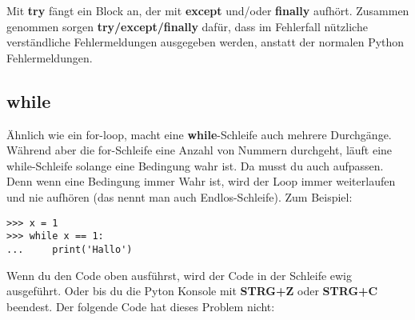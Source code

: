 Mit \textbf{try} fängt ein Block an, der mit \textbf{except} und/oder \textbf{finally} aufhört. Zusammen genommen sorgen \textbf{try/except/finally} dafür, dass im Fehlerfall nützliche verständliche Fehlermeldungen ausgegeben werden, anstatt der normalen Python Fehlermeldungen.

\subsection*{while}

Ähnlich wie ein for-loop, macht eine \textbf{while}-Schleife auch mehrere Durchgänge. Während aber die for-Schleife eine Anzahl von Nummern durchgeht, läuft eine while-Schleife solange eine Bedingung wahr ist. Da musst du auch aufpassen. Denn wenn eine Bedingung immer Wahr ist, wird der Loop immer weiterlaufen und nie aufhören (das nennt man auch Endlos-Schleife). Zum Beispiel:

\begin{Verbatim}[frame=single]
>>> x = 1
>>> while x == 1:
...     print('Hallo')
\end{Verbatim}

Wenn du den Code oben ausführst, wird der Code in der Schleife ewig ausgeführt. Oder bis du die Pyton Konsole mit \textbf{STRG+Z} oder \textbf{STRG+C} beendest. Der folgende Code hat dieses Problem nicht:

